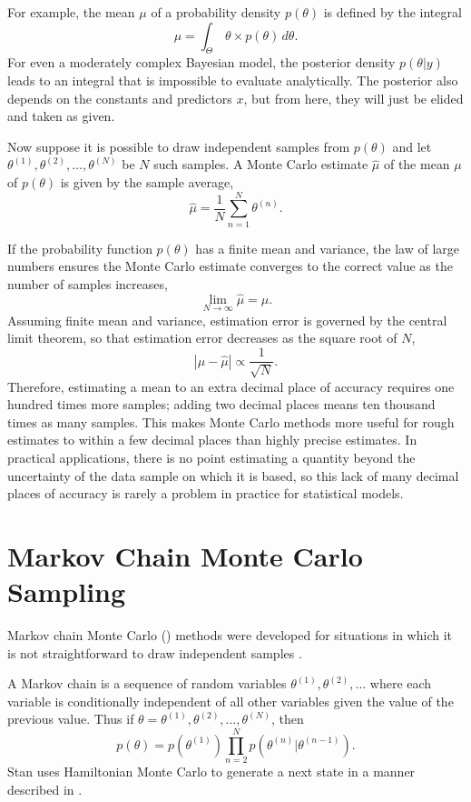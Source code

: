 For example, the mean $\mu$ of a probability density $p(\theta)$ is
defined by the integral
\[
\mu = \int_{\Theta} \, \theta \times p(\theta) \, d\theta.
\]
For even a moderately complex Bayesian model, the posterior density
$p(\theta|y)$ leads to an integral that is impossible to evaluate
analytically.  The posterior also depends on the constants and
predictors $x$, but from here, they will just be elided and taken as
given.

Now suppose it is possible to draw independent samples from
$p(\theta)$ and let $\theta^{(1)},\theta^{(2)},\ldots,\theta^{(N)}$ be
$N$ such samples.  A Monte Carlo estimate $\hat{\mu}$ of the mean
$\mu$ of $p(\theta)$ is given by the sample average,
\[
\hat{\mu} = \frac{1}{N} \sum_{n=1}^N \theta^{(n)}.
\]

If the probability function $p(\theta)$ has a finite mean and
variance, the law of large numbers ensures the Monte Carlo estimate
converges to the correct value as the number of samples increases,
\[
\lim_{N \rightarrow \infty} \hat{\mu} = \mu.
\]
Assuming finite mean and variance, estimation error is governed by the
central limit theorem, so that estimation error decreases as the
square root of $N$,
\[
|\mu - \hat{\mu}| \propto \frac{1}{\sqrt{N}}.
\]
Therefore, estimating a mean to an extra decimal place of accuracy
requires one hundred times more samples; adding two decimal places
means ten thousand times as many samples.  This makes Monte Carlo
methods more useful for rough estimates to within a few decimal places
than highly precise estimates.  In practical applications, there is no
point estimating a quantity beyond the uncertainty of the data sample
on which it is based, so this lack of many decimal places of accuracy
is rarely a problem in practice for statistical models.


\section{Markov Chain Monte Carlo Sampling}

Markov chain Monte Carlo (\MCMC) methods were developed for situations
in which it is not straightforward to draw independent samples
\citep{Metropolis:1953}.

A Markov chain is a sequence of random variables $\theta^{(1)},
\theta^{(2)},\ldots$ where each variable is conditionally independent
of all other variables given the value of the previous value.  Thus if
$\theta = \theta^{(1)}, \theta^{(2)},\ldots, \theta^{(N)}$, then
\[
p(\theta) = p(\theta^{(1)}) \prod_{n=2}^N p(\theta^{(n)}|\theta^{(n-1)}).
\]
Stan uses Hamiltonian Monte Carlo to generate a next state in a manner
described in .

